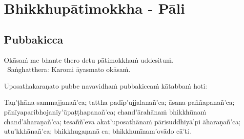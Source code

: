 

\chapter{Bhikkhupātimokkha - Pāli}

\clearpage



\section{Pubbakicca}
\label{pubbakicca}

\begin{intro}
	Okāsaṁ me bhante thero detu pātimokkhaṁ uddesituṁ.\makeatletter\hyperlink{endnote13-appendix}\makeatother\\
	\anglebracketleft\ \hspace{-0.5mm}Saṅghatthera: Karomi āyasmato okāsaṁ. \hspace{-0.5mm}\anglebracketright\
\end{intro}

Uposathakaraṇato pubbe navavidhaṁ pubbakiccaṁ kātabbaṁ hoti:

Taṇ'ṭhāna-sammajjanañ'ca; tattha padīp'ujjalanañ'ca; āsana-paññapanañ'ca; pānīyaparibhojanīy'ūpaṭṭhapanañ'ca; chand'ārahānaṁ bhikkhūnaṁ chand'āharaṇañ'ca; tesaññ'eva akat'uposathānaṁ pārisuddhiyā'pi āharaṇañ'ca; utu'kkhānañ'ca; bhikkhugaṇanā ca; bhikkhunīnam'ovādo cā'ti.

